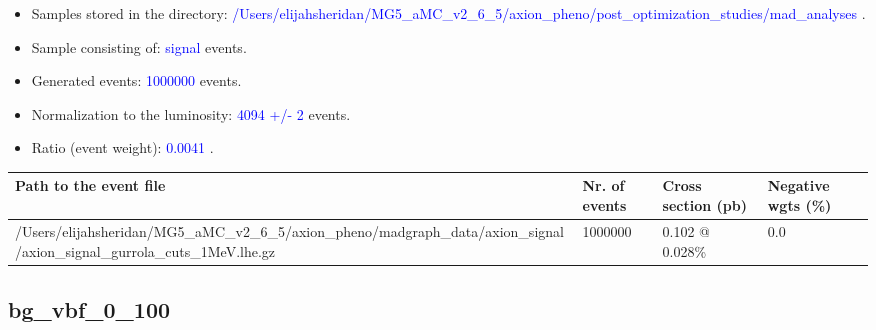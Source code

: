 \documentclass[a4paper, 10pt]{article}
\begin{document}
\begin{itemize}
  \item Samples stored in the directory: \textcolor{blue}{/\-Users/\-elijahsheridan/\-MG5\_aMC\_v2\_6\_5/\-axion\_pheno/\-post\_optimization\_studies/\-mad\_analyses} .
   \item Sample consisting of: \textcolor{blue}{signal}  events.
   \item Generated events: \textcolor{blue}{1000000 }  events.
   \item Normalization to the luminosity: \textcolor{blue}{4094}\textcolor{blue}{ +/\-- }\textcolor{blue}{2 }  events.
   \item Ratio (event weight): \textcolor{blue}{0.0041 } .  
 
\end{itemize}
\begin{table}[H]
  \begin{center}
    \begin{tabular}{|m{55.0mm}|m{25.0mm}|m{30.0mm}|m{30.0mm}|}
      \hline
      {\cellcolor{yellow}         Path to the event file}& {\cellcolor{yellow}         Nr. of events}& {\cellcolor{yellow}         Cross section (pb)}& {\cellcolor{yellow}         Negative wgts (\%)}\\
      \hline
      {\cellcolor{white}          /\-Users/\-elijahsheridan/\-MG5\_aMC\_v2\_6\_5/\-axion\_pheno/\-madgraph\_data/\-axion\_signal/\-axion\_signal\_gurrola\_cuts\_1MeV.lhe.gz}& {\cellcolor{white}          1000000}& {\cellcolor{white}          0.102 @ 0.028\%}& {\cellcolor{white}          0.0}\\
\hline
    \end{tabular}
  \end{center}
\end{table}

\subsection{ bg\_vbf\_0\_100}
\end{document}
